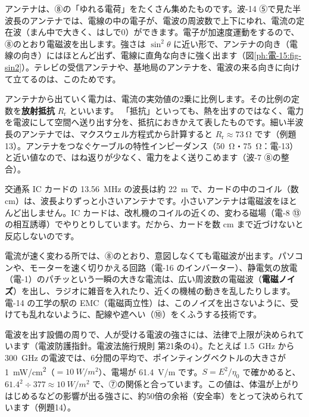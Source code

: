 
\leavevmode\label{ph:電-15:sec11}アンテナは、⑧の「ゆれる電荷」をたくさん集めたものです。波-14 ⑤で見た半波長のアンテナでは、電線の中の電子が、電波の周波数で上下にゆれ、電流の定在波（まん中で大きく、はしで0）ができます。電子が加速度運動をするので、⑧のとおり電磁波を出します。強さは $\sin^2\theta$ に近い形で、アンテナの向き（電線の向き）にはほとんど出ず、電線に直角な向きに強く出ます（図\ref{ph:電-15:fig-sin2}）。テレビの受信アンテナや、基地局のアンテナを、電波の来る向きに向けて立てるのは、このためです。

アンテナから出ていく電力は、電流の実効値の2乗に比例します。その比例の定数を\textbf{放射抵抗} $R_{\mathrm r}$ といいます。
\label{ph:電-15:Rr}「抵抗」といっても、熱を出すのではなく、電力を電波にして空間へ送り出す分を、抵抗におきかえて表したものです。細い半波長のアンテナでは、マクスウェル方程式から計算すると $R_{\mathrm r}\approx\qty{73}{\ohm}$ です（例題13）。アンテナをつなぐケーブルの特性インピーダンス（\qty{50}{\ohm}・\qty{75}{\ohm}：電-13）と近い値なので、はね返りが少なく、電力をよく送りこめます（波-7 ⑧の整合）。

\begin{phmijika}
交通系 IC カードの \qty{13.56}{MHz} の波長は約 \qty{22}{m} で、カードの中のコイル（数 cm）は、波長よりずっと小さいアンテナです。小さいアンテナは電磁波をほとんど出しません。IC カードは、改札機のコイルの近くの、変わる磁場（電-8 ⑬の相互誘導）でやりとりしています。だから、カードを数 cm まで近づけないと反応しないのです。
\end{phmijika}


\leavevmode\label{ph:電-15:sec12}電流が速く変わる所では、⑧のとおり、意図しなくても電磁波が出ます。パソコンや、モーターを速く切りかえる回路（電-16 のインバーター）、静電気の放電（電-1）のパチッという一瞬の大きな電流は、広い周波数の電磁波（\textbf{電磁ノイズ}）を出し、ラジオに雑音を入れたり、近くの機械の動きを乱したりします。電-14 の工学の駅の EMC（電磁両立性）は、このノイズを出さないように、受けても乱れないように、配線や遮へい（⑩）をくふうする技術です。

電波を出す設備の周りで、人が受ける電波の強さには、法律で上限が決められています（電波防護指針。電波法施行規則 第21条の4）。たとえば \qty{1.5}{GHz} から \qty{300}{GHz} の電波では、6分間の平均で、ポインティングベクトルの大きさが \qty{1}{mW/cm^2}（$=\qty{10}{W/m^2}$）、電場が \qty{61.4}{V/m} です。$S=E^2/\eta_0$ で確かめると、$61.4^2\div377\approx\qty{10}{W/m^2}$ で、⑦の関係と合っています。この値は、体温が上がりはじめるなどの影響が出る強さに、約50倍の余裕（安全率）をとって決められています（例題14）。

